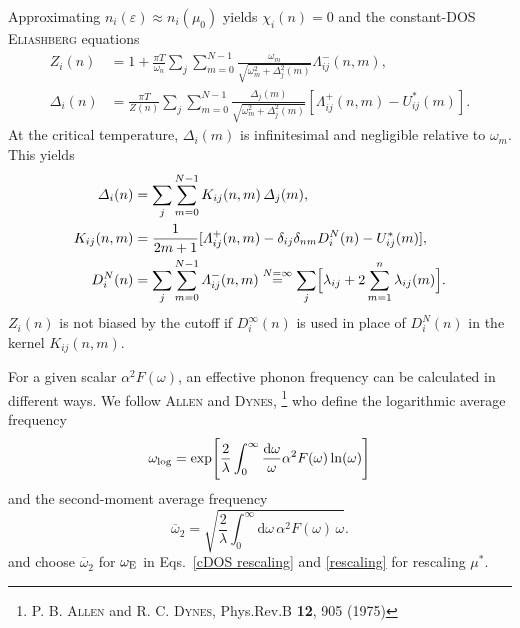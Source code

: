 \documentclass[a4paper]{article}
\def\D{\mathrm d}
\def\sub#1{\sb{\mathrm{#1}}}
\let\Delta\varDelta
\let\epsilon\varepsilon
\let\Lambda\varLambda
\newlength\gap
\begin{document}
   Approximating $n_i(\epsilon) \approx n_i(\mu_0)$ yields $\chi_i(n) = 0$ and
   the constant-DOS \textsc{Eliashberg} equations
   \begin{equation}
      \begin{split}
         Z_i(n) &= 1 + \frac{\pi T}{\omega_n} \sum_j \sum_{m = 0}^{N - 1}
         \frac{\omega_m}{\sqrt{\omega_m^2 + \Delta_j^2(m)}}
         \Lambda_{i j}^-(n, m),
         \\
         \Delta_i(n) &= \frac{\pi T}{Z(n)} \sum_j \sum_{m = 0}^{N - 1}
         \frac{\Delta_j(m)}{\sqrt{\omega_m^2 + \Delta_j^2(m)}}
         [\Lambda_{i j}^+(n, m) - U^*_{i j}(m)].
      \end{split}
      \label{cDOS Eliashberg equations}
   \end{equation}
   At the critical temperature, $\Delta_i(m)$ is infinitesimal and negligible
   relative to $\omega_m$. This yields
   \begin{equation}
      \begin{split}
         \Delta_i(n) &= \sum_j \sum_{m = 0}^{N - 1}
         K_{i j}(n, m) \, \Delta_j(m),
         \\
         K_{i j}(n, m) &= \frac 1 {2 m + 1} [\Lambda_{i j}^+(n, m)
         - \delta_{i j} \delta_{n m} D_i^N(n) - U^*_{i j}(m)],
         \\
         D_i^N(n) &= \sum_j \sum_{m = 0}^{N - 1} \Lambda_{i j}^-(n, m)
         \overset{N = \infty} =
         \sum_j \Bigl[ \lambda_{i j} + 2 \sum_{m = 1}^n \lambda_{i j}(m) \Bigr].
      \end{split}
      \label{linearized gap equation}
   \end{equation}
   $Z_i(n)$ is not biased by the cutoff if $D_i^\infty(n)$ is used in place of
   $D_i^N(n)$ in the kernel $K_{i j}(n, m)$.

   For a given scalar $\alpha^2 F(\omega)$, an effective phonon frequency can be
   calculated in different ways. We follow \textsc{Allen} and \textsc{Dynes},%
   \footnote{%
      P. B. \textsc{Allen} and R. C. \textsc{Dynes}, Phys.\@ Rev.\@ B
      \textbf{12}, 905 (1975)
      }
   who define the logarithmic average frequency
   \begin{equation*}
       \omega \sub{log} = \exp
       \Biggl[
          \frac 2 \lambda \int_0^\infty
          \frac{\D \omega} \omega
          \alpha^2 F(\omega) \ln(\omega)
       \Biggr]
   \end{equation*}
   and the second-moment average frequency
   \begin{equation*}
       \overline \omega_2 = \sqrt
       {
          \frac 2 \lambda \int_0^\infty
          \D \omega \,
          \alpha^2 F(\omega) \, \omega
       }.
   \end{equation*}
   and choose $\overline \omega_2$ for $\omega \sub E$ in Eqs.~\ref{cDOS
   rescaling} and \ref{rescaling} for rescaling $\mu^*$.
\end{document}

